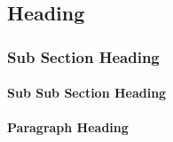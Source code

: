 
\subsection{Heading}

\subsubsection{Sub Section Heading}

\paragraph{Sub Sub Section Heading}

\paragraph{Paragraph Heading}
